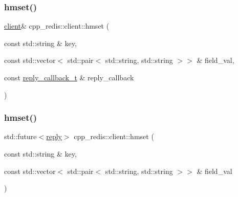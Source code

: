 \mbox{\label{classcpp__redis_1_1client_a8c5f96c6e663d89aa18baba495872cfb}} 
\subsubsection{\texorpdfstring{hmset()}{hmset()}\hspace{0.1cm}{\footnotesize\ttfamily [1/2]}}
{\footnotesize\ttfamily \hyperlink{classcpp__redis_1_1client}{client}\& cpp\+\_\+redis\+::client\+::hmset (\begin{DoxyParamCaption}\item[{const std\+::string \&}]{key,  }\item[{const std\+::vector$<$ std\+::pair$<$ std\+::string, std\+::string $>$$>$ \&}]{field\+\_\+val,  }\item[{const \hyperlink{classcpp__redis_1_1client_a061a1140d36d2eaeda82b09a0bb3f9f2}{reply\+\_\+callback\+\_\+t} \&}]{reply\+\_\+callback }\end{DoxyParamCaption})}

\mbox{\label{classcpp__redis_1_1client_acbb8d8fa40a64a155e19e49aae12f117}} 
\subsubsection{\texorpdfstring{hmset()}{hmset()}\hspace{0.1cm}{\footnotesize\ttfamily [2/2]}}
{\footnotesize\ttfamily std\+::future$<$\hyperlink{classcpp__redis_1_1reply}{reply}$>$ cpp\+\_\+redis\+::client\+::hmset (\begin{DoxyParamCaption}\item[{const std\+::string \&}]{key,  }\item[{const std\+::vector$<$ std\+::pair$<$ std\+::string, std\+::string $>$$>$ \&}]{field\+\_\+val }\end{DoxyParamCaption})}

\mbox{\label{classcpp__redis_1_1client_a3d5367719dc31fb3dfa49202d1e7f9ad}} 

